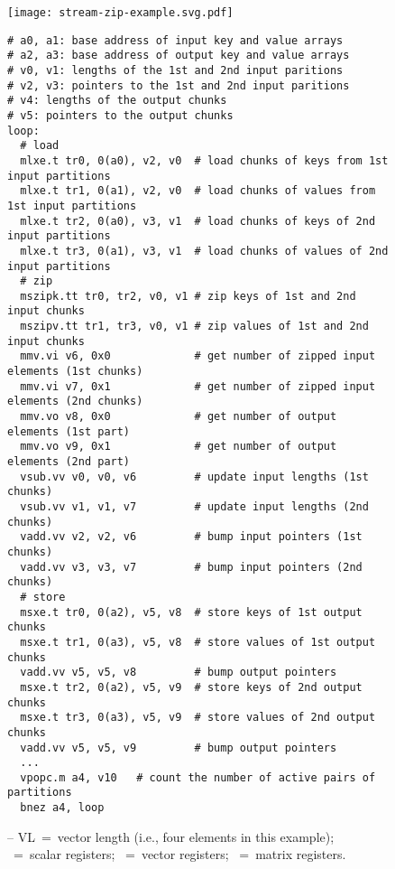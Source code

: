 
\lstset{style=riscv-asm-style}

\begin{figure}[tp]

\centering
\texttt{[image: stream-zip-example.svg.pdf]}

\begin{lstlisting}[xleftmargin=0.025\tw]
# a0, a1: base address of input key and value arrays
# a2, a3: base address of output key and value arrays
# v0, v1: lengths of the 1st and 2nd input paritions
# v2, v3: pointers to the 1st and 2nd input paritions
# v4: lengths of the output chunks
# v5: pointers to the output chunks
loop:
  # load
  mlxe.t tr0, 0(a0), v2, v0  # load chunks of keys from 1st input partitions
  mlxe.t tr1, 0(a1), v2, v0  # load chunks of values from 1st input partitions
  mlxe.t tr2, 0(a0), v3, v1  # load chunks of keys of 2nd input partitions
  mlxe.t tr3, 0(a1), v3, v1  # load chunks of values of 2nd input partitions
  # zip
  mszipk.tt tr0, tr2, v0, v1 # zip keys of 1st and 2nd input chunks
  mszipv.tt tr1, tr3, v0, v1 # zip values of 1st and 2nd input chunks
  mmv.vi v6, 0x0             # get number of zipped input elements (1st chunks)
  mmv.vi v7, 0x1             # get number of zipped input elements (2nd chunks)
  mmv.vo v8, 0x0             # get number of output elements (1st part)
  mmv.vo v9, 0x1             # get number of output elements (2nd part)
  vsub.vv v0, v0, v6         # update input lengths (1st chunks)
  vsub.vv v1, v1, v7         # update input lengths (2nd chunks)
  vadd.vv v2, v2, v6         # bump input pointers (1st chunks)
  vadd.vv v3, v3, v7         # bump input pointers (2nd chunks)
  # store
  msxe.t tr0, 0(a2), v5, v8  # store keys of 1st output chunks
  msxe.t tr1, 0(a3), v5, v8  # store values of 1st output chunks
  vadd.vv v5, v5, v8         # bump output pointers
  msxe.t tr2, 0(a2), v5, v9  # store keys of 2nd output chunks
  msxe.t tr3, 0(a3), v5, v9  # store values of 2nd output chunks
  vadd.vv v5, v5, v9         # bump output pointers
  ...
  vpopc.m a4, v10   # count the number of active pairs of partitions
  bnez a4, loop
\end{lstlisting}

\caption[Zipping Partitions of Keys and Values across Multiple Streams in Parallel]{
   --
  VL~=~vector length (i.e., four elements in this example);
  ~=~scalar registers;
  ~=~vector registers;
  ~=~matrix registers.
}
\label{fig-spz-mszip-code}
\end{figure}
